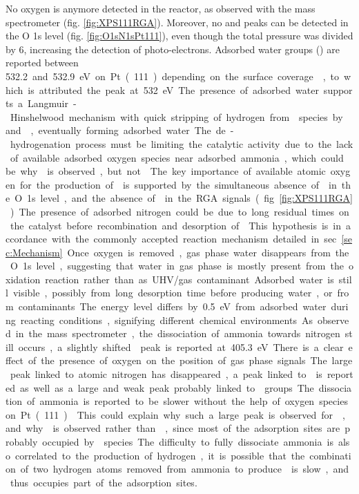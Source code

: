 No oxygen is anymore detected in the reactor, as observed with the mass spectrometer (fig. \ref{fig:XPS111RGA}).
Moreover, no  and  peaks can be detected in the O 1s level (fig. \ref{fig:O1sN1sPt111}), even though the total pressure was divided by \num{6}, increasing the detection of photo-electrons.
Adsorbed water groups () are reported between \qty{532.2} and \qty{532.9} eV on Pt(111) depending on the surface coverage \parencite{Fisher1980, Kiskinova1985}, to which is attributed the peak at \qty{532}{\eV}.

The presence of adsorbed water supports a Langmuir-Hinshelwood mechanism with quick stripping of hydrogen from  species by  and , eventually forming adsorbed water.
The de-hydrogenation process must be limiting the catalytic activity due to the lack of available adsorbed oxygen species near adsorbed ammonia, which could be why  is observed, but not .
The key importance of available atomic oxygen for the production of  is supported by the simultaneous absence of  in the O 1s level, and the absence of  in the RGA signals (fig. \ref{fig:XPS111RGA}).
The presence of adsorbed nitrogen could be due to long residual times on the catalyst before recombination and desorption of .
This hypothesis is in accordance with the commonly accepted reaction mechanism detailed in sec. \ref{sec:Mechanism}.

Once oxygen is removed, gas phase water disappears from the O 1s level, suggesting that water in gas phase is mostly present from the oxidation reaction rather than as UHV/gas contaminant.
Adsorbed water is still visible, possibly from long desorption time before producing water, or from contaminants.
The energy level differs by \qty{0.5}{\eV} from adsorbed water during reacting conditions, signifying different chemical environments.
As observed in the mass spectrometer, the dissociation of ammonia towards nitrogen still occurs, a slightly shifted  peak is reported at \qty{405.3}{\eV}.
There is a clear effect of the presence of oxygen on the position of gas phase signals.
The large peak linked to atomic nitrogen has disappeared, a peak linked to  is reported as well as a large and weak peak probably linked to  groups.
The dissociation of ammonia is reported to be slower without the help of oxygen species on Pt(111) \parencite{Offermans2006,Offermans2007, Imbihl2007, NovellLeruth2008}.
This could explain why such a large peak is observed for , and why  is observed rather than , since most of the adsorption sites are probably occupied by  species.
The difficulty to fully dissociate ammonia is also correlated to the production of hydrogen, it is possible that the combination of two hydrogen atoms removed from ammonia to produce  is slow, and thus occupies part of the adsorption sites.

